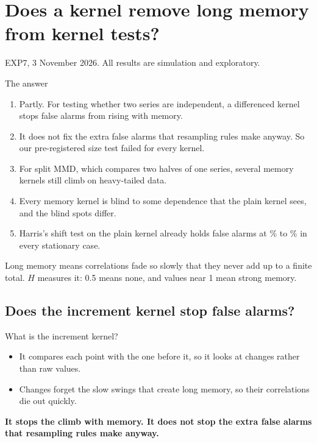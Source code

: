 \documentclass[11pt,a4paper]{article}
\begin{document}
\section*{Does a kernel remove long memory from kernel tests?}
{\color{ink2} EXP7, 3 November 2026. All results are simulation and exploratory.}

\begin{answer}
The answer
\end{answer}
\begin{enumerate}[leftmargin=1.6em,itemsep=6pt]
\item Partly. For testing whether two series are independent, a differenced kernel stops false alarms from rising with memory.
\item It does not fix the extra false alarms that resampling rules make anyway. So our pre-registered size test failed for every kernel.
\item For split MMD, which compares two halves of one series, several memory kernels still climb on heavy-tailed data.
\item Every memory kernel is blind to some dependence that the plain kernel sees, and the blind spots differ.
\item Harris's shift test on the plain kernel already holds false alarms at \% to \% in every stationary case.
\end{enumerate}

{\color{ink2}\small Long memory means correlations fade so slowly that they never add up to a finite total.
$H$ measures it: 0.5 means none, and values near 1 mean strong memory.}

\newpage
\needspace{9cm}
\subsection*{Does the increment kernel stop false alarms?}
\begin{explain}{What is the increment kernel?}
\begin{itemize}[itemsep=1pt]
\item It compares each point with the one before it, so it looks at changes rather than raw values.
\item Changes forget the slow swings that create long memory, so their correlations die out quickly.
\end{itemize}
\end{explain}
\textbf{It stops the climb with memory. It does not stop the extra false alarms that resampling rules make anyway.}
\end{document}
